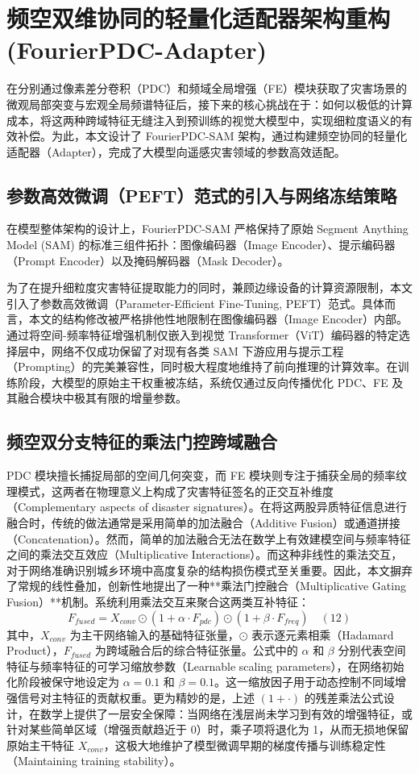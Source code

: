 \section{频空双维协同的轻量化适配器架构重构 (FourierPDC-Adapter)}
在分别通过像素差分卷积（PDC）和频域全局增强（FE）模块获取了灾害场景的微观局部突变与宏观全局频谱特征后，接下来的核心挑战在于：如何以极低的计算成本，将这两种跨域特征无缝注入到预训练的视觉大模型中，实现细粒度语义的有效补偿。为此，本文设计了 FourierPDC-SAM 架构，通过构建频空协同的轻量化适配器（Adapter），完成了大模型向遥感灾害领域的参数高效适配。
\subsection{参数高效微调（PEFT）范式的引入与网络冻结策略}
在模型整体架构的设计上，FourierPDC-SAM 严格保持了原始 Segment Anything Model (SAM) 的标准三组件拓扑：图像编码器（Image Encoder）、提示编码器（Prompt Encoder）以及掩码解码器（Mask Decoder）。

为了在提升细粒度灾害特征提取能力的同时，兼顾边缘设备的计算资源限制，本文引入了参数高效微调（Parameter-Efficient Fine-Tuning, PEFT）范式。具体而言，本文的结构修改被严格排他性地限制在图像编码器（Image Encoder）内部。通过将空间-频率特征增强机制仅嵌入到视觉 Transformer（ViT）编码器的特定选择层中，网络不仅成功保留了对现有各类 SAM 下游应用与提示工程（Prompting）的完美兼容性，同时极大程度地维持了前向推理的计算效率。在训练阶段，大模型的原始主干权重被冻结，系统仅通过反向传播优化 PDC、FE 及其融合模块中极其有限的增量参数。

\subsection{频空双分支特征的乘法门控跨域融合}
PDC 模块擅长捕捉局部的空间几何突变，而 FE 模块则专注于捕获全局的频率纹理模式，这两者在物理意义上构成了灾害特征签名的正交互补维度（Complementary aspects of disaster signatures）。在将这两股异质特征信息进行融合时，传统的做法通常是采用简单的加法融合（Additive Fusion）或通道拼接（Concatenation）。然而，简单的加法融合无法在数学上有效建模空间与频率特征之间的乘法交互效应（Multiplicative Interactions）。而这种非线性的乘法交互，对于网络准确识别城乡环境中高度复杂的结构损伤模式至关重要。因此，本文摒弃了常规的线性叠加，创新性地提出了一种**乘法门控融合（Multiplicative Gating Fusion）**机制。系统利用乘法交互来聚合这两类互补特征：$$F_{fused} = X_{conv} \odot (1 + \alpha \cdot F_{pdc}) \odot (1 + \beta \cdot F_{freq}) \quad (12)$$其中，$X_{conv}$ 为主干网络输入的基础特征张量，$\odot$ 表示逐元素相乘（Hadamard Product），$F_{fused}$ 为跨域融合后的综合特征张量。公式中的 $\alpha$ 和 $\beta$ 分别代表空间特征与频率特征的可学习缩放参数（Learnable scaling parameters），在网络初始化阶段被保守地设定为 $\alpha=0.1$ 和 $\beta=0.1$。这一缩放因子用于动态控制不同域增强信号对主特征的贡献权重。更为精妙的是，上述 $(1 + \cdot)$ 的残差乘法公式设计，在数学上提供了一层安全保障：当网络在浅层尚未学习到有效的增强特征，或针对某些简单区域（增强贡献趋近于 0）时，乘子项将退化为 1，从而无损地保留原始主干特征 $X_{conv}$，这极大地维护了模型微调早期的梯度传播与训练稳定性（Maintaining training stability）。

